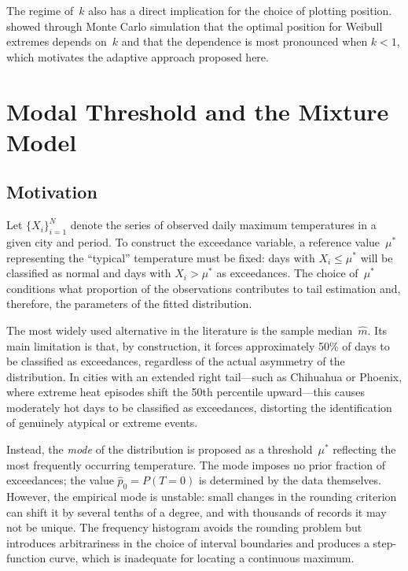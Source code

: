 \documentclass[APA,STIX1COL]{WileyNJD-v2}
\begin{document}
The regime of~$k$ also has a direct implication for the choice
of plotting position. \citet{goda1988,goda2010} showed through
Monte Carlo simulation that the optimal position for Weibull
extremes depends on~$k$ and that the dependence is most
pronounced when $k<1$, which motivates the adaptive approach
proposed here.

\section{Modal Threshold and the Mixture Model}
\label{sec:threshold}

\subsection{Motivation}

Let $\{X_i\}_{i=1}^{N}$ denote the series of observed daily
maximum temperatures in a given city and period. To construct the
exceedance variable, a reference value~$\mu^*$ representing the
``typical'' temperature must be fixed: days with $X_i\leq\mu^*$
will be classified as normal and days with $X_i>\mu^*$ as
exceedances. The choice of~$\mu^*$ conditions what proportion of
the observations contributes to tail estimation and, therefore,
the parameters of the fitted distribution.

The most widely used alternative in the literature is the sample
median~$\hat{m}$. Its main limitation is that, by construction,
it forces approximately 50\% of days to be classified as
exceedances, regardless of the actual asymmetry of the
distribution. In cities with an extended right tail---such as
Chihuahua or Phoenix, where extreme heat episodes shift the
50th percentile upward---this causes moderately hot days to be
classified as exceedances, distorting the identification of
genuinely atypical or extreme events.

Instead, the \emph{mode} of the distribution is proposed as
a threshold~$\mu^*$ reflecting the most frequently occurring
temperature. The mode imposes no prior fraction of exceedances;
the value $\hat{p}_0=P(T=0)$ is determined by the data
themselves. However, the empirical mode is unstable: small
changes in the rounding criterion can shift it by several tenths
of a degree, and with thousands of records it may not be unique.
The frequency histogram avoids the rounding problem but introduces
arbitrariness in the choice of interval boundaries and produces a
step-function curve, which is inadequate for locating a
continuous maximum.
\end{document}
